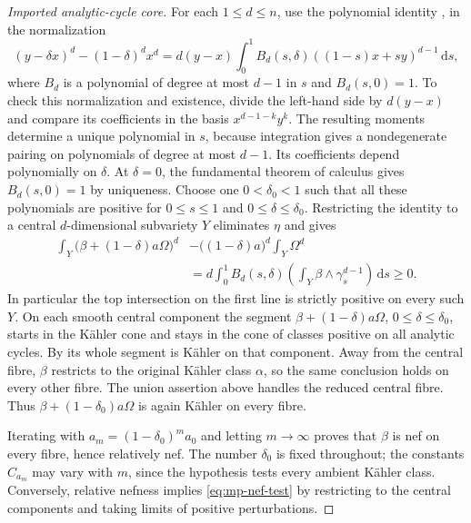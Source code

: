 \begin{proof}[Imported analytic-cycle core]
For each $1\leq d\leq n$, use the polynomial identity
\cite[Equation~(4.4) and its proof, pp.~1267--1268]{DP04}, in the
normalization
\[
 (y-\delta x)^d-(1-\delta)^d x^d
 =d(y-x)\int_0^1 B_d(s,\delta)((1-s)x+sy)^{d-1}\,\mathrm{d}s,
\]
where $B_d$ is a polynomial of degree at most $d-1$ in $s$ and
$B_d(s,0)=1$.  To check this normalization and existence, divide the
left-hand side by $d(y-x)$ and compare its coefficients in the basis
$x^{d-1-k}y^k$.  The resulting moments determine a unique polynomial
in $s$, because integration gives a nondegenerate pairing on
polynomials of degree at most $d-1$.  Its coefficients depend
polynomially on $\delta$.  At $\delta=0$, the fundamental theorem of
calculus gives $B_d(s,0)=1$ by uniqueness.  Choose one
$0<\delta_0<1$ such that all these polynomials are positive for
$0\leq s\leq1$ and $0\leq\delta\leq\delta_0$.
Restricting the identity to a central $d$-dimensional subvariety $Y$
eliminates $\eta$ and gives
\begin{align*}
 \int_Y\bigl(\beta+(1-\delta)a\Omega\bigr)^d
 &-\bigl((1-\delta)a\bigr)^d\int_Y\Omega^d\\
 &=d\int_0^1 B_d(s,\delta)
       \left(\int_Y\beta\wedge\gamma_s^{d-1}\right)
          \,\mathrm{d}s\geq0.
\end{align*}
In particular the top intersection on the first line is strictly
positive on every such $Y$.  On each smooth central component the
segment $\beta+(1-\delta)a\Omega$, $0\leq\delta\leq\delta_0$, starts
in the K\"ahler cone and stays in the cone of classes positive on all
analytic cycles.  By \cite[Theorem~0.1]{DP04} its whole segment is
K\"ahler on that component.  Away from the central fibre, $\beta$
restricts to the original K\"ahler class $\alpha$, so the same
conclusion holds on every other fibre.  The union assertion above handles
the reduced central fibre.  Thus $\beta+(1-\delta_0)a\Omega$ is again
K\"ahler on every fibre.

Iterating with $a_m=(1-\delta_0)^m a_0$ and letting $m\to\infty$ proves
that $\beta$ is nef on every fibre, hence relatively nef.  The number
$\delta_0$ is fixed throughout; the constants $C_{a_m}$ may vary with
$m$, since the hypothesis tests every ambient K\"ahler class.
Conversely, relative nefness implies \eqref{eq:mp-nef-test} by restricting
to the central components and taking limits of positive perturbations.


\end{proof}
